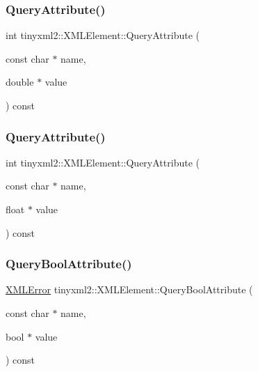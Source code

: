 \subsubsection{\texorpdfstring{Query\+Attribute()}{QueryAttribute()}\hspace{0.1cm}{\footnotesize\ttfamily [5/6]}}
{\footnotesize\ttfamily int tinyxml2\+::\+X\+M\+L\+Element\+::\+Query\+Attribute (\begin{DoxyParamCaption}\item[{const char $\ast$}]{name,  }\item[{double $\ast$}]{value }\end{DoxyParamCaption}) const\hspace{0.3cm}{\ttfamily [inline]}}

\mbox{\label{classtinyxml2_1_1_x_m_l_element_a493b6dace830e4dba7110b1e9f6bebd5}} 
\subsubsection{\texorpdfstring{Query\+Attribute()}{QueryAttribute()}\hspace{0.1cm}{\footnotesize\ttfamily [6/6]}}
{\footnotesize\ttfamily int tinyxml2\+::\+X\+M\+L\+Element\+::\+Query\+Attribute (\begin{DoxyParamCaption}\item[{const char $\ast$}]{name,  }\item[{float $\ast$}]{value }\end{DoxyParamCaption}) const\hspace{0.3cm}{\ttfamily [inline]}}

\mbox{\label{classtinyxml2_1_1_x_m_l_element_a14c1bb77c39689838be01838d86ca872}} 
\subsubsection{\texorpdfstring{Query\+Bool\+Attribute()}{QueryBoolAttribute()}}
{\footnotesize\ttfamily \hyperlink{namespacetinyxml2_a1fbf88509c3ac88c09117b1947414e08}{X\+M\+L\+Error} tinyxml2\+::\+X\+M\+L\+Element\+::\+Query\+Bool\+Attribute (\begin{DoxyParamCaption}\item[{const char $\ast$}]{name,  }\item[{bool $\ast$}]{value }\end{DoxyParamCaption}) const\hspace{0.3cm}{\ttfamily [inline]}}



